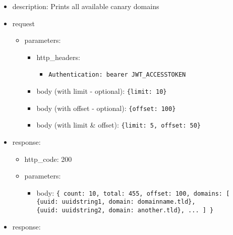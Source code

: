 \documentclass[
]{article}
\begin{document}
\begin{itemize}
\item
  description: Prints all available canary domains
\item
  request

  \begin{itemize}
  \item
    parameters:

    \begin{itemize}
    \item
      http\_headers:

      \begin{itemize}
      \item
        \texttt{Authentication:\ \textquotesingle{}bearer\ JWT\_ACCESSTOKEN\textquotesingle{}}
      \end{itemize}
    \item
      body (with limit - optional):
      \texttt{\{\textquotesingle{}limit\textquotesingle{}:\ 10\}}
    \item
      body (with offset - optional):
      \texttt{\{\textquotesingle{}offset\textquotesingle{}:\ 100\}}
    \item
      body (with limit \& offset):
      \texttt{\{\textquotesingle{}limit\textquotesingle{}:\ 5,\ \textquotesingle{}offset\textquotesingle{}:\ 50\}}
    \end{itemize}
  \end{itemize}
\item
  response:

  \begin{itemize}
  \item
    http\_code: 200
  \item
    parameters:

    \begin{itemize}
    \item
      body: \texttt{\{
      \textquotesingle{}count\textquotesingle{}:\ 10,
      \textquotesingle{}total\textquotesingle{}:\ 455,
      \textquotesingle{}offset\textquotesingle{}:\ 100,
      \textquotesingle{}domains\textquotesingle{}:\ {[}
      	\{\textquotesingle{}uuid\textquotesingle{}:\ \textquotesingle{}uuidstring1\textquotesingle{},\ \textquotesingle{}domain\textquotesingle{}:\ \textquotesingle{}domainname.tld\textquotesingle{}\},
      	\{\textquotesingle{}uuid\textquotesingle{}:\ \textquotesingle{}uuidstring2\textquotesingle{},\ \textquotesingle{}domain\textquotesingle{}:\ \textquotesingle{}another.tld\textquotesingle{}\},
      	...
      {]}
      \}}
    \end{itemize}
  \end{itemize}
\item
  response:


\end{itemize}
\end{document}
